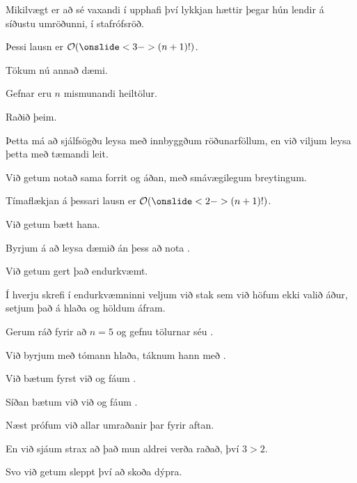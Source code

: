 {
}

{
	{
		\item<1-> Mikilvægt er að  sé vaxandi í upphafi því lykkjan hættir þegar hún lendir á síðustu umröðunni, í stafrófsröð.
		\item<2-> Þessi lausn er $\mathcal{O}(\onslide<3->{(n + 1)!})$.
	}
}

{
	{
		\item<1-> Tökum nú annað dæmi.
		\item<2-> Gefnar eru $n$ mismunandi heiltölur.
		\item<3-> Raðið þeim.
		\item<4-> Þetta má að sjálfsögðu leysa með innbyggðum röðunarföllum, en við viljum leysa þetta með tæmandi leit.
		\item<5-> Við getum notað sama forrit og áðan, með smávægilegum breytingum.
	}
}

{
}

{
	{
		\item<1-> Tímaflækjan á þessari lausn er $\mathcal{O}(\onslide<2->{(n + 1)!})$.
		\item<3-> Við getum bætt hana.
		\item<4-> Byrjum á að leysa dæmið án þess að nota .
		\item<5-> Við getum gert það endurkvæmt.
		\item<6-> Í hverju skrefi í endurkvæmninni veljum við stak sem við höfum ekki valið áður, setjum það á hlaða og höldum áfram.
	}
}

{
}

{
	{
		\item<1-> Gerum ráð fyrir að $n = 5$ og gefnu tölurnar séu .
		\item<2-> Við byrjum með tómann hlaða, táknum hann með .
		\item<3-> Við bætum fyrst við  og fáum .
		\item<4-> Síðan bætum við  við og fáum .
		\item<5-> Næst prófum við allar umraðanir  þar fyrir aftan.
		\item<6-> En við sjáum strax að það mun aldrei verða raðað, því $3 > 2$.
		\item<7-> Svo við getum sleppt því að skoða dýpra.
	}
}

